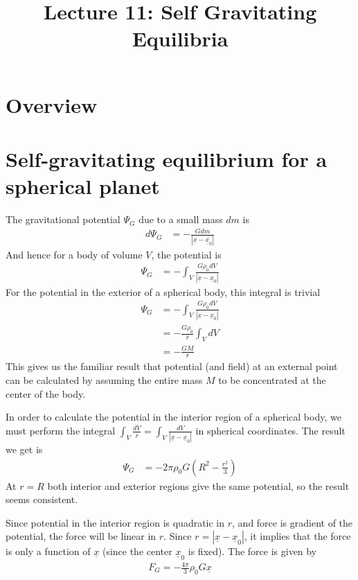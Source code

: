 \documentclass[11pt,a4paper]{article}
\title{Lecture 11: Self Gravitating Equilibria}
\date{\displaydate{date}}
\author{}
\newcommand{\vect}[1]{\underline{#1}}
\newcommand{\1}{\vect{1}}
\begin{document}
\maketitle
\section*{Overview}

\section{Self-gravitating equilibrium for a spherical planet}
The gravitational potential $\Psi_G$ due to a small mass $dm$ is
\begin{align*}
d\Psi_G &= -\frac{G dm}{|{\vect x - \vect x_0}|}
\end{align*}
And hence for a body of volume $V$, the potential is 
\begin{align*}
\Psi_G &= -\int_V \frac{G \rho_0 dV}{|{\vect x - \vect x_0}|}
\end{align*}
For the potential in the exterior of a spherical body, this integral is trivial
\begin{align*}
\Psi_G &= -\int_V \frac{G \rho_0 dV}{|{\vect x - \vect x_0}|}\\
&=-\frac{G \rho_0}{r} \int_V dV \\
&=-\frac{G M}{r} 
\end{align*}
This gives us the familiar result that potential (and field) at an external point can be calculated by assuming the entire mass $M$ to be concentrated at the center of the body.

In order to calculate the potential in the interior region of a spherical body, we must perform the integral $\int_V \frac{dV}{r} = \int_V \frac{dV}{|\vect x - \vect x_0|}$ in spherical coordinates. The result we get is
\begin{align*}
\Psi_G &= -2 \pi \rho_0 G (R^2 - \frac{r^2}{3})
\end{align*}
At $r=R$ both interior and exterior regions give the same potential, so the result seems consistent. 

Since potential in the interior region is quadratic in $r$, and force is gradient of the potential, the force will be linear in $r$. Since $r = |\vect x - \vect x_0|$, it implies that the force is only a function of $\vect x$ (since the center $\vect x_0$ is fixed). The force is given by
\begin{align*}
F_G = -\frac{4\pi}{3}\rho_0 G\vect x
\end{align*}
\end{document}
